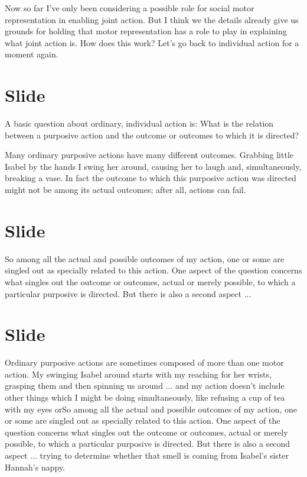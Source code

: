 \documentclass[12pt,\papersize]{extarticle}
\begin{document}
Now so far I’ve only been considering a possible role for social motor representation in enabling joint action.  
But I think we the details already give us grounds for holding that motor representation has a role to play in explaining what joint action is.
How does this work?
Let’s go back to individual action for a moment again.



\section{Slide}
A basic question about ordinary, individual action is:
What is the relation between a purposive action and the outcome or outcomes to which it is directed?

Many ordinary purposive actions have many different outcomes.
Grabbing little Isabel by the hands I swing her around, causing her to laugh and, simultaneously, breaking a vase.
In fact the outcome to which this purposive action was directed might not be among its actual outcomes; after all, actions can fail.



\section{Slide}
So among all the actual and possible outcomes of my action, one or some are singled out as specially related to this action.
One aspect of the question concerns what singles out the outcome or outcomes, actual or merely possible, to which a particular purposive is directed.
But there is also a second aspect ...



\section{Slide}
Ordinary purposive actions are sometimes composed of more than one motor action.  My swinging Isabel around starts with my reaching for her wrists, grasping them and then spinning us around ... and my action doesn’t include other things which I might be doing simultaneously, like refusing a cup of tea with my eyes orSo among all the actual and possible outcomes of my action, one or some are singled out as specially related to this action.
One aspect of the question concerns what singles out the outcome or outcomes, actual or merely possible, to which a particular purposive is directed.
But there is also a second aspect ...
 trying to determine whether that smell is coming from Isabel’s sister Hannah’s nappy.
\end{document}
